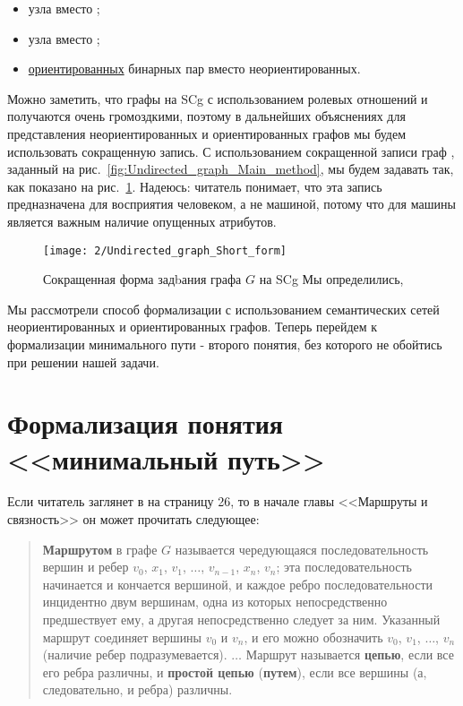 \begin{itemize}
\item узла  вместо ;
\item узла  вместо ;
\item \underline{ориентированных} бинарных пар вместо
  неориентированных.
\end{itemize}

Можно заметить, что графы на SCg с использованием ролевых отношений
 и  получаются очень громоздкими, поэтому в
дальнейших объяснениях для представления неориентированных и
ориентированных графов мы будем использовать сокращенную запись. С
использованием сокращенной записи граф , заданный на
рис.~\ref{fig:Undirected_graph_Main_method}, мы будем задавать так,
как показано на рис.~\ref{fig:Undirected_graph_Short_form}. Надеюсь:
читатель понимает, что эта запись предназначена для восприятия
человеком, а не машиной, потому что для машины является важным наличие
опущенных атрибутов.

\begin{figure}[h!]
  \centering
  \texttt{[image: 2/Undirected\_graph\_Short\_form]}
  \caption{Сокращенная форма задbания графа $G$ на SCg Мы определились,}
  \label{fig:Undirected_graph_Short_form}
\end{figure}

Мы рассмотрели способ формализации с использованием семантических
сетей неориентированных и ориентированных графов. Теперь перейдем к
формализации минимального пути - второго понятия, без которого не
обойтись при решении нашей задачи.

\section{Формализация понятия <<минимальный путь>>}
\label{sec:onto_form_min_path}

Если читатель заглянет в \cite{hararigraph} на страницу 26, то в
начале главы <<Маршруты и связность>> он может прочитать следующее:

\begin{quotation}
  \textbf{Маршрутом} в графе $G$ называется чередующаяся
  последовательность вершин и ребер $v_0$, $x_1$, $v_1$, $\dotsc$,
  $v_{n-1}$, $x_n$, $v_n$; эта последовательность начинается и
  кончается вершиной, и каждое ребро последовательности инцидентно
  двум вершинам, одна из которых непосредственно предшествует ему, а
  другая непосредственно следует за ним. Указанный маршрут соединяет
  вершины $v_0$ и $v_n$, и его можно обозначить $v_0$, $v_1$,
  $\dotsc$, $v_n$ (наличие ребер подразумевается). $\dots$ Маршрут
  называется \textbf{цепью}, если все его ребра различны, и
  \textbf{простой цепью} (\textbf{путем}), если все вершины (а,
  следовательно, и ребра) различны.
\end{quotation}

